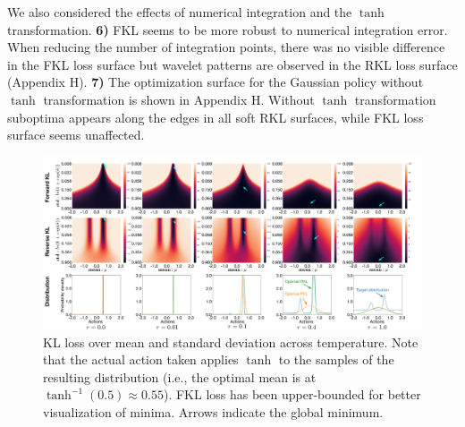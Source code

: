 \documentclass{article}
\begin{document}
We also considered the effects of numerical integration and the $\tanh$ transformation.
\textbf{6)} FKL seems to be more robust to numerical integration error. When reducing the number of integration points, there was no visible difference in the FKL loss surface but wavelet patterns are observed in the RKL loss surface (Appendix H).
\textbf{7)} The optimization surface for the Gaussian policy without $\tanh$ transformation is shown in Appendix H. Without $\tanh$ transformation suboptima appears along the edges in all soft RKL surfaces, while FKL loss surface seems unaffected.

\begin{figure}
    \centering
    \includegraphics[width=0.99\columnwidth]{figs/bandit/trueQ/heatmaps/heatmap_combined.pdf}
    \caption{KL loss over mean and standard deviation across temperature. Note that the actual action taken applies $\tanh$ to the samples of the resulting distribution (i.e., the optimal mean is at $\tanh^{-1}(0.5) \approx 0.55$). FKL loss has been upper-bounded for better visualization of minima. Arrows indicate the global minimum.}
    \label{fig:bandit-heatmap}
\end{figure}

\end{document}
